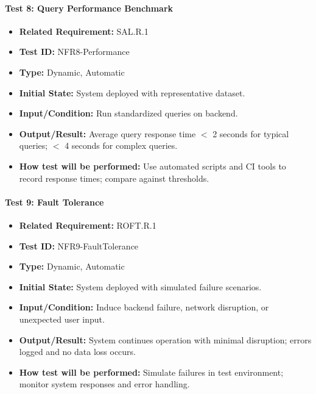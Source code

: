 \documentclass[12pt, titlepage]{article}
\begin{document}
\paragraph{Test 8: Query Performance Benchmark}
\begin{itemize}
    \item \textbf{Related Requirement:} SAL.R.1
    \item \textbf{Test ID:} NFR8-Performance
    \item \textbf{Type:} Dynamic, Automatic
    \item \textbf{Initial State:} System deployed with representative dataset.
    \item \textbf{Input/Condition:} Run standardized queries on backend.
    \item \textbf{Output/Result:} Average query response time $<$ 2 seconds for typical queries; $<$ 4 seconds for complex queries.
    \item \textbf{How test will be performed:} Use automated scripts and CI tools to record response times; compare against thresholds.
\end{itemize}

\paragraph{Test 9: Fault Tolerance}
\begin{itemize}
    \item \textbf{Related Requirement:} ROFT.R.1
    \item \textbf{Test ID:} NFR9-FaultTolerance
    \item \textbf{Type:} Dynamic, Automatic
    \item \textbf{Initial State:} System deployed with simulated failure scenarios.
    \item \textbf{Input/Condition:} Induce backend failure, network disruption, or unexpected user input.
    \item \textbf{Output/Result:} System continues operation with minimal disruption; errors logged and no data loss occurs.
    \item \textbf{How test will be performed:} Simulate failures in test environment; monitor system responses and error handling.
\end{itemize}
\end{document}
